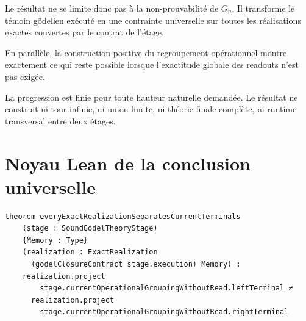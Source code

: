 \documentclass[11pt,a4paper]{article}
\begin{document}
Le résultat ne se limite donc pas à la non-prouvabilité de $G_n$. Il transforme
le témoin gödelien exécuté en une contrainte universelle sur toutes les
réalisations exactes couvertes par le contrat de l'étage.

En parallèle, la construction positive du regroupement opérationnel montre
exactement ce qui reste possible lorsque l'exactitude globale des readouts
n'est pas exigée.

La progression est finie pour toute hauteur naturelle demandée. Le résultat
ne construit ni tour infinie, ni union limite, ni théorie finale complète, ni
runtime transversal entre deux étages.

\section{Noyau Lean de la conclusion universelle}

\small
\begin{verbatim}
theorem everyExactRealizationSeparatesCurrentTerminals
    (stage : SoundGodelTheoryStage)
    {Memory : Type}
    (realization : ExactRealization
      (godelClosureContract stage.execution) Memory) :
    realization.project
        stage.currentOperationalGroupingWithoutRead.leftTerminal ≠
      realization.project
        stage.currentOperationalGroupingWithoutRead.rightTerminal
\end{verbatim}
\normalsize
\end{document}
